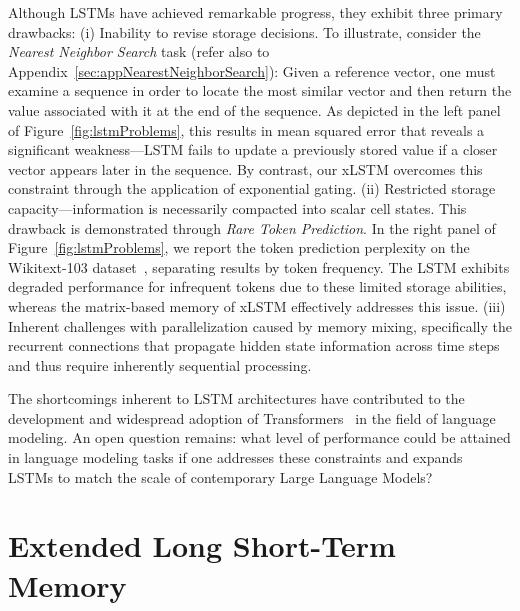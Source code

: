 Although LSTMs have achieved remarkable progress, they exhibit three primary drawbacks: (i) Inability to revise storage decisions. To illustrate, consider the {\it Nearest Neighbor Search} task (refer also to Appendix~\ref{sec:appNearestNeighborSearch}): Given a reference vector, one must examine a sequence in order to locate the most similar vector and then return the value associated with it at the end of the sequence. As depicted in the left panel of Figure~\ref{fig:lstmProblems}, this results in mean squared error that reveals a significant weakness—LSTM fails to update a previously stored value if a closer vector appears later in the sequence. By contrast, our xLSTM overcomes this constraint through the application of exponential gating. (ii) Restricted storage capacity—information is necessarily compacted into scalar cell states. This drawback is demonstrated through {\it Rare Token Prediction}. In the right panel of Figure~\ref{fig:lstmProblems}, we report the token prediction perplexity on the Wikitext-103 dataset~\citep{Merity:17}, separating results by token frequency. The LSTM exhibits degraded performance for infrequent tokens due to these limited storage abilities, whereas the matrix-based memory of xLSTM effectively addresses this issue. (iii) Inherent challenges with parallelization caused by memory mixing, specifically the recurrent connections that propagate hidden state information across time steps and thus require inherently sequential processing.

The shortcomings inherent to LSTM architectures have contributed to the development and widespread adoption of Transformers~\citep{Vaswani:17} in the field of language modeling. An open question remains: what level of performance could be attained in language modeling tasks if one addresses these constraints and expands LSTMs to match the scale of contemporary Large Language Models?

\section{Extended Long Short-Term Memory}
\label{sec:xLSTM}

